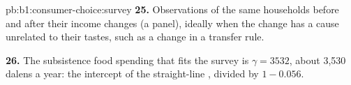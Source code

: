 \begin{solution}{pb:b1:consumer-choice:survey}
\textbf{25.} Observations of the same households before and after their
income changes (a panel), ideally when the change has a cause unrelated to
their tastes, such as a change in a transfer rule.

\textbf{26.} The subsistence food spending that fits the survey is
$\gamma = 3532$, about 3,530 dalens a year: the intercept of the straight-line
, divided by $1 - 0.056$.
\end{solution}
